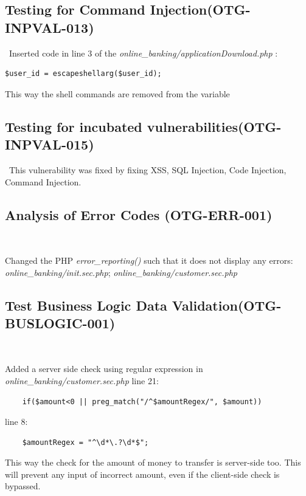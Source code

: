 \documentclass[headsepline,footsepline,footinclude=false,oneside,fontsize=11pt,paper=a4,listof=totoc,bibliography=totoc]{scrbook} %
\begin{document}
\subsection{Testing for Command Injection(OTG-INPVAL-013)}\
Inserted code in line 3 of the \textit{online\_banking/applicationDownload.php} : 

\begin{lstlisting} 
$user_id = escapeshellarg($user_id);
\end{lstlisting}

 This way the shell commands are removed from the variable\\
 

\subsection{Testing for incubated vulnerabilities(OTG-INPVAL-015)}\
This vulnerability was fixed by fixing XSS, SQL Injection, Code Injection, Command Injection.
 
 
\subsection{Analysis of Error Codes (OTG-ERR-001)}\

Changed the PHP \textit{error\_reporting()} such that it does not display any errors: \textit{online\_banking/init.sec.php}; \textit{online\_banking/customer.sec.php}\\

\pagebreak
\subsection{Test Business Logic Data Validation(OTG-BUSLOGIC-001)}\

Added a server side check using regular expression in \textit{online\_banking/customer.sec.php} line 21: 
	\begin{lstlisting} 
	if($amount<0 || preg_match("/^$amountRegex/", $amount)) 
	\end{lstlisting}
	
	line 8:  
	
	\begin{lstlisting} 
	$amountRegex = "^\d*\.?\d*$";
	\end{lstlisting}
	
This way the check for the amount of money to transfer is server-side too. This will prevent any input of incorrect amount, even if the client-side check is bypassed.\\
\end{document}
